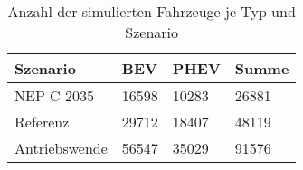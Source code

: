 {
\renewcommand{\arraystretch}{1.2}%
\begin{table}[H]
	\begin{center}
		\caption{Anzahl der simulierten Fahrzeuge je Typ und Szenario}
		\begin{tabu} to 0.6\textwidth {X[1.2] X[1, r] X[1, r] X[1, r]}
			\toprule
			Szenario         & BEV         & PHEV        & Summe       \\ \midrule
			NEP C \num{2035} & \num{16598} & \num{10283} & \num{26881} \\
			Referenz         & \num{29712} & \num{18407} & \num{48119} \\
			Antriebswende    & \num{56547} & \num{35029} & \num{91576} \\ \bottomrule
		\end{tabu}
		\label{tab:car_count}
	\end{center}
	\vspace{-3mm}%
\end{table}
}